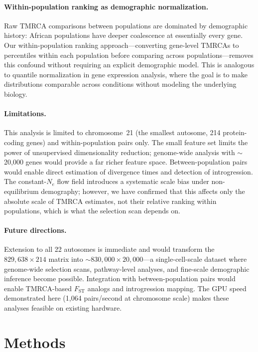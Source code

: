 \documentclass[10pt,letterpaper]{article}
\begin{document}
\paragraph{Within-population ranking as demographic normalization.}
Raw TMRCA comparisons between populations are dominated by demographic history: African populations have deeper coalescence at essentially every gene.
Our within-population ranking approach---converting gene-level TMRCAs to percentiles within each population before comparing across populations---removes this confound without requiring an explicit demographic model.
This is analogous to quantile normalization in gene expression analysis, where the goal is to make distributions comparable across conditions without modeling the underlying biology.

\paragraph{Limitations.}
This analysis is limited to chromosome~21 (the smallest autosome, 214 protein-coding genes) and within-population pairs only.
The small feature set limits the power of unsupervised dimensionality reduction; genome-wide analysis with $\sim$20{,}000 genes would provide a far richer feature space.
Between-population pairs would enable direct estimation of divergence times and detection of introgression.
The constant-$N_e$ flow field introduces a systematic scale bias under non-equilibrium demography; however, we have confirmed that this affects only the absolute scale of TMRCA estimates, not their relative ranking within populations, which is what the selection scan depends on.

\paragraph{Future directions.}
Extension to all 22 autosomes is immediate and would transform the $829{,}638 \times 214$ matrix into $\sim$$830{,}000 \times 20{,}000$---a single-cell-scale dataset where genome-wide selection scans, pathway-level analyses, and fine-scale demographic inference become possible.
Integration with between-population pairs would enable TMRCA-based $F_{\text{ST}}$ analogs and introgression mapping.
The GPU speed demonstrated here (1{,}064 pairs/second at chromosome scale) makes these analyses feasible on existing hardware.

\section*{Methods}
\end{document}
